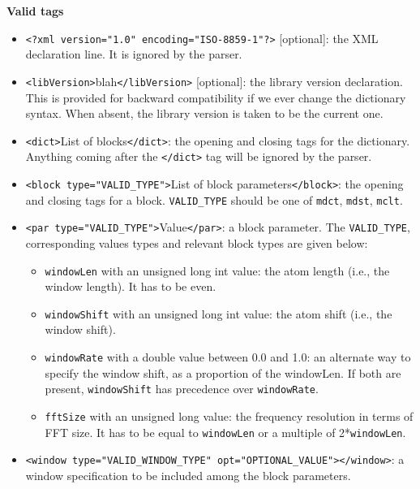 \documentclass[11pt,a4paper]{article}
\begin{document}
\textbf{Valid tags}
\begin{itemize}

\item \verb+<?xml version="1.0" encoding="ISO-8859-1"?>+ [optional]: the XML
  declaration line. It is ignored by the parser.
  
\item \verb+<libVersion>+blah\verb+</libVersion>+ [optional]: the library
  version declaration. This is provided for backward compatibility if we ever
  change the dictionary syntax. When absent, the library version is taken to be
  the current one.

\item \verb+<dict>+List of blocks\verb+</dict>+: the opening and closing tags
  for the dictionary. Anything coming after the \verb+</dict>+ tag will be
  ignored by the parser.
  
\item \verb+<block type="VALID_TYPE">+List of block parameters\verb+</block>+:
  the opening and closing tags for a block.  \verb+VALID_TYPE+ should be one of
  \verb+mdct+, \verb+mdst+, \verb+mclt+.
  
\item \verb+<par type="VALID_TYPE">+Value\verb+</par>+: a block
  parameter. The \verb+VALID_TYPE+, corresponding values types and
  relevant block types are given below:
  \begin{itemize}

  \item \verb+windowLen+ with an unsigned long int value: the atom length
    (i.e., the window length). It has to be even.

  \item \verb+windowShift+ with an unsigned long int value: the atom
    shift (i.e., the window shift).
    
  \item \verb+windowRate+ with a double value between 0.0 and 1.0: an
    alternate way to specify the window shift, as a proportion of the
    windowLen.  If both are present, \verb+windowShift+ has precedence over
    \verb+windowRate+.
    
  \item \verb+fftSize+ with an unsigned long value: the frequency
    resolution in terms of FFT size. It has to be equal to \verb+windowLen+ or a multiple of 2*\verb+windowLen+.

  \end{itemize}
  
\item \verb+<window type="VALID_WINDOW_TYPE" opt="OPTIONAL_VALUE"></window>+: a
  window specification to be included among the block parameters.
  

\end{itemize}
\end{document}
